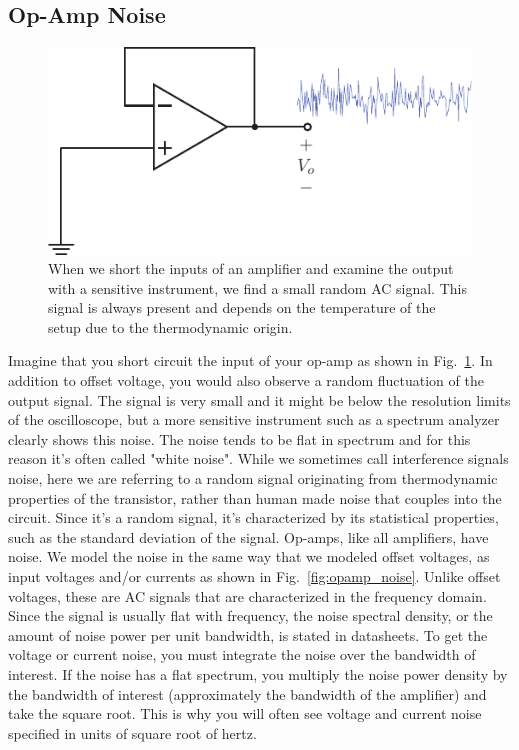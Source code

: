 \subsection{Op-Amp Noise}
\begin{figure}[tb]
\centering
\includegraphics[scale=1]{opamp_unitygain_noise}
\caption{When we short the inputs of an amplifier and examine the output with a sensitive instrument, we find a small random AC signal.  This signal is always present and depends on the temperature of the setup due to the thermodynamic origin.}
\label{fig:opamp_unitygain_noise_fig}
\end{figure}
Imagine that you short circuit the input of your op-amp as shown in Fig.~\ref{fig:opamp_unitygain_noise_fig}. In addition to offset voltage, you would also observe a random fluctuation of the output signal.  The signal is very small and it might be below the resolution limits of the oscilloscope, but a more sensitive instrument such as a spectrum analyzer clearly shows this noise.  The noise tends to be flat in spectrum and for this reason it's often called "white noise".  While we sometimes call interference signals noise, here we are referring to a random signal originating from thermodynamic properties of the transistor, rather than human made noise that couples into the circuit.   Since it's a random signal, it's characterized by its statistical properties, such as the standard deviation of the signal.  
Op-amps, like all amplifiers, have noise.  We model the noise in the same way that we modeled offset voltages, as input voltages and/or currents as shown in Fig.~\ref{fig:opamp_noise}.  Unlike offset voltages, these are AC signals that are characterized in the frequency domain.  Since the signal is usually flat with frequency, the noise spectral density, or the amount of noise power per unit bandwidth, is stated in datasheets.  To get the voltage or current noise, you must integrate the noise over the bandwidth of interest.  If the noise has a flat spectrum, you multiply the noise power density by the bandwidth of interest (approximately the bandwidth of the amplifier) and take the square root.  This is why you will often see voltage and current noise specified in units of square root of hertz.
